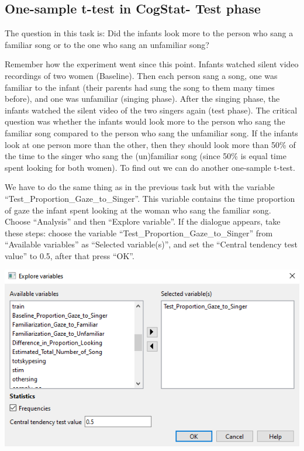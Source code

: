 \documentclass[
]{book}
\begin{document}
\hypertarget{one-sample-t-test-in-cogstat--test-phase}{%
\subsection{One-sample t-test in CogStat- Test phase}\label{one-sample-t-test-in-cogstat--test-phase}}

The question in this task is: Did the infants look more to the person who sang a familiar song or to the one who sang an unfamiliar song?

Remember how the experiment went since this point. Infants watched silent video recordings of two women (Baseline). Then each person sang a song, one was familiar to the infant (their parents had sung the song to them many times before), and one was unfamiliar (singing phase). After the singing phase, the infants watched the silent video of the two singers again (test phase). The critical question was whether the infants would look more to the person who sang the familiar song compared to the person who sang the unfamiliar song. If the infants look at one person more than the other, then they should look more than 50\% of the time to the singer who sang the (un)familiar song (since 50\% is equal time spent looking for both women). To find out we can do another one-sample t-test.

We have to do the same thing as in the previous task but with the variable ``Test\_Proportion\_Gaze\_to\_Singer''. This variable contains the time proportion of gaze the infant spent looking at the woman who sang the familiar song. Choose ``Analysis'' and then ``Explore variable''. If the dialogue appears, take these steps: choose the variable ``Test\_Proportion\_Gaze\_to\_Singer'' from ``Available variables'' as ``Selected variable(s)'', and set the ``Central tendency test value'' to 0.5, after that press ``OK''.

\includegraphics{img/ch6/6.5expvarwindow.png}
\end{document}

